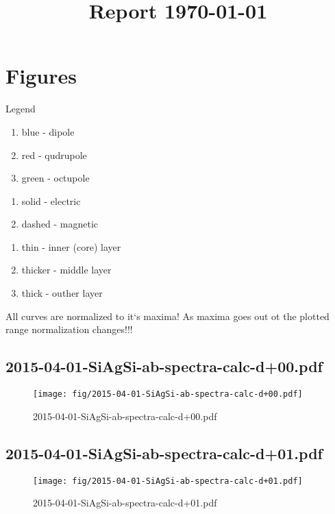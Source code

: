 \documentclass[fullscreen=true]{beamer}
\begin{document}
\title{Report \today}
\section{Figures}
\begin{frame}{Legend} %
  \begin{block}{}
    \begin{enumerate}
    \item blue - dipole
    \item red  - qudrupole
    \item green - octupole      
    \end{enumerate}
  \end{block}
  \begin{block}{}
    \begin{enumerate}
    \item solid - electric
    \item dashed  - magnetic
    \end{enumerate}
  \end{block}
  \begin{block}{}
    \begin{enumerate}
    \item thin - inner (core) layer
    \item thicker - middle layer
    \item thick - outher layer      
    \end{enumerate}
  \end{block}
All curves are normalized to it`s maxima! As maxima goes out ot the
plotted range normalization changes!!!
\end{frame}

\subsection{2015-04-01-SiAgSi-ab-spectra-calc-d+00.pdf}
\begin{frame}
  \begin{figure}
    \texttt{[image: fig/2015-04-01-SiAgSi-ab-spectra-calc-d+00.pdf]}%
    \caption{2015-04-01-SiAgSi-ab-spectra-calc-d+00.pdf}
  \end{figure}
\end{frame}

\subsection{2015-04-01-SiAgSi-ab-spectra-calc-d+01.pdf}
\begin{frame}
  \begin{figure}
    \texttt{[image: fig/2015-04-01-SiAgSi-ab-spectra-calc-d+01.pdf]}%
    \caption{2015-04-01-SiAgSi-ab-spectra-calc-d+01.pdf}
  \end{figure}
\end{frame}
\end{document}
